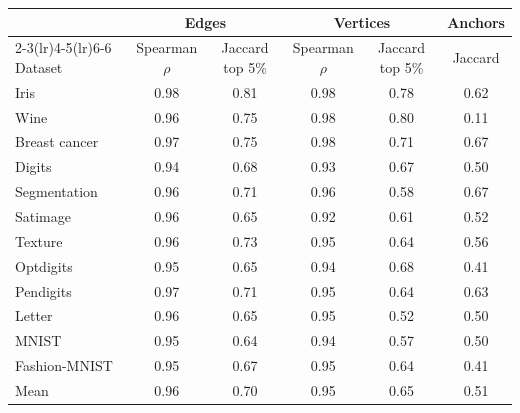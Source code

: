 \begin{tabular}{@{}lccccc@{}}
\toprule
 & \multicolumn{2}{c}{Edges} & \multicolumn{2}{c}{Vertices} & Anchors \\
\cmidrule(lr){2-3}\cmidrule(lr){4-5}\cmidrule(lr){6-6}
Dataset & Spearman $\rho$ & Jaccard top 5\% & Spearman $\rho$ & Jaccard top 5\% & Jaccard \\
\midrule
Iris & 0.98 & 0.81 & 0.98 & 0.78 & 0.62 \\
Wine & 0.96 & 0.75 & 0.98 & 0.80 & 0.11 \\
Breast cancer & 0.97 & 0.75 & 0.98 & 0.71 & 0.67 \\
Digits & 0.94 & 0.68 & 0.93 & 0.67 & 0.50 \\
Segmentation & 0.96 & 0.71 & 0.96 & 0.58 & 0.67 \\
Satimage & 0.96 & 0.65 & 0.92 & 0.61 & 0.52 \\
Texture & 0.96 & 0.73 & 0.95 & 0.64 & 0.56 \\
Optdigits & 0.95 & 0.65 & 0.94 & 0.68 & 0.41 \\
Pendigits & 0.97 & 0.71 & 0.95 & 0.64 & 0.63 \\
Letter & 0.96 & 0.65 & 0.95 & 0.52 & 0.50 \\
MNIST & 0.95 & 0.64 & 0.94 & 0.57 & 0.50 \\
Fashion-MNIST & 0.95 & 0.67 & 0.95 & 0.64 & 0.41 \\
\midrule
Mean & 0.96 & 0.70 & 0.95 & 0.65 & 0.51 \\
\bottomrule
\end{tabular}
